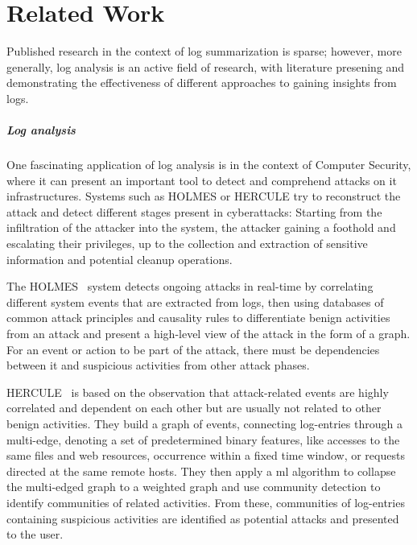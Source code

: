 \chapter{Related Work}\label{ch:related_work}

\acresetall


Published research in the context of log summarization is sparse;
however, more generally, log analysis is an active field of research,
with literature presening and demonstrating the effectiveness of
different approaches to gaining insights from logs.

\paragraph{Log analysis}

One fascinating application of log analysis is
in the context of Computer Security, where it can present an important tool to
detect and comprehend attacks on \ac{it} infrastructures.
Systems such as HOLMES or HERCULE try to reconstruct the attack and detect different stages present in cyberattacks:
Starting from the infiltration of the attacker into the system,
the attacker gaining a foothold and escalating their privileges,
up to the collection and extraction of sensitive information and potential cleanup operations.

The HOLMES~\parencite{holmes} system detects ongoing attacks in real-time
by correlating different system events that are extracted from logs,
then using databases of common attack principles and causality rules to differentiate benign activities
from an attack and present a high-level view of the attack in the form of a graph.
For an event or action to be part of the attack,
there must be dependencies between it and suspicious activities from other attack phases.

HERCULE~\parencite{hercule} is based on the observation
that attack-related events are highly correlated and dependent on each other
but are usually not related to other benign activities.
They build a graph of events, connecting log-entries through a multi-edge, denoting a set of predetermined binary features,
like accesses to the same files and web resources, occurrence within a fixed time window, or requests directed at the same remote hosts.
They then apply a \acl{ml} algorithm to collapse the multi-edged graph to a weighted graph
and use community detection to identify communities of related activities.
From these, communities of log-entries containing suspicious activities
are identified as potential attacks and presented to the user.

